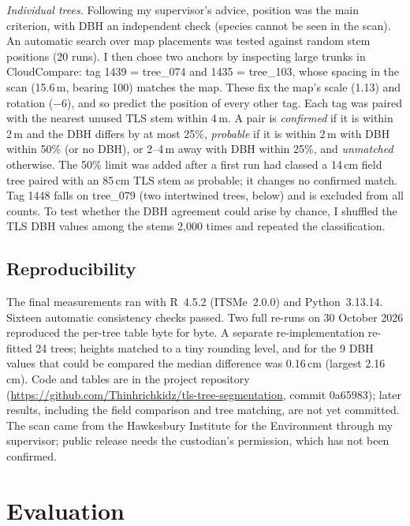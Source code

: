 \documentclass[runningheads]{llncs}
\begin{document}
\emph{Individual trees.} Following my supervisor's advice, position was the main criterion, with DBH an independent check (species cannot be seen in the scan). An automatic search over map placements was tested against random stem positions (20 runs). I then chose two anchors by inspecting large trunks in CloudCompare: tag 1439 = tree\_074 and 1435 = tree\_103, whose spacing in the scan (15.6\,m, bearing 100\textdegree) matches the map. These fix the map's scale (1.13) and rotation ($-$6\textdegree), and so predict the position of every other tag. Each tag was paired with the nearest unused TLS stem within 4\,m. A pair is \emph{confirmed} if it is within 2\,m and the DBH differs by at most 25\%, \emph{probable} if it is within 2\,m with DBH within 50\% (or no DBH), or 2--4\,m away with DBH within 25\%, and \emph{unmatched} otherwise. The 50\% limit was added after a first run had classed a 14\,cm field tree paired with an 85\,cm TLS stem as probable; it changes no confirmed match. Tag 1448 falls on tree\_079 (two intertwined trees, below) and is excluded from all counts. To test whether the DBH agreement could arise by chance, I shuffled the TLS DBH values among the stems 2,000 times and repeated the classification.

\subsection{Reproducibility}\label{sec:repro}
{\sloppy The final measurements ran with R~4.5.2 (ITSMe~2.0.0) and Python~3.13.14. Sixteen automatic consistency checks passed. Two full re-runs on 30 October 2026 reproduced the per-tree table byte for byte. A separate re-implementation re-fitted 24 trees; heights matched to a tiny rounding level, and for the 9 DBH values that could be compared the median difference was 0.16\,cm (largest 2.16\,cm). Code and tables are in the project repository (\url{https://github.com/Thinhrichkidz/tls-tree-segmentation}, commit 0a65983); later results, including the field comparison and tree matching, are not yet committed. The scan came from the Hawkesbury Institute for the Environment through my supervisor; public release needs the custodian's permission, which has not been confirmed.\par}

\section{Evaluation}\label{sec:eval}
\end{document}
